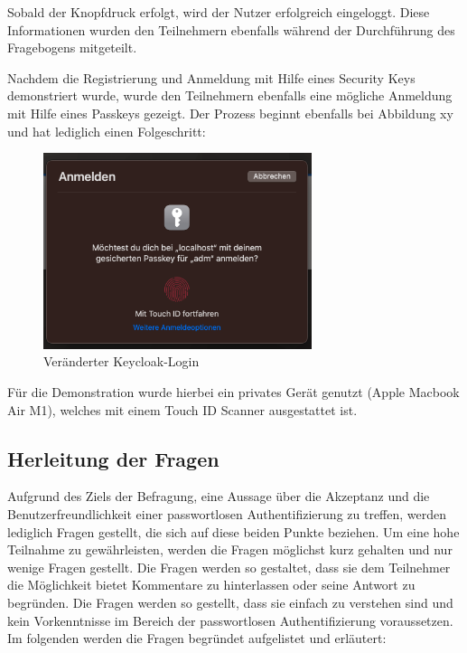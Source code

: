 Sobald der Knopfdruck erfolgt, wird der Nutzer erfolgreich eingeloggt. Diese Informationen wurden den Teilnehmern ebenfalls während der Durchführung des Fragebogens mitgeteilt. 

Nachdem die Registrierung und Anmeldung mit Hilfe eines Security Keys demonstriert wurde, wurde den Teilnehmern ebenfalls eine mögliche Anmeldung mit Hilfe eines Passkeys gezeigt. Der Prozess beginnt ebenfalls bei Abbildung xy und hat lediglich einen Folgeschritt:

\begin{figure}[h]
	\centering 
	\includegraphics[width=0.7\textwidth]{img/abbildungen/passkey_demo.png}
	\captionsetup{format=hang}
	\caption{Veränderter Keycloak-Login}
\end{figure}

Für die Demonstration wurde hierbei ein privates Gerät genutzt (Apple Macbook Air M1), welches mit einem Touch ID Scanner ausgestattet ist.


\subsection{Herleitung der Fragen} \label{questions}
Aufgrund des Ziels der Befragung, eine Aussage über die Akzeptanz und die Benutzerfreundlichkeit einer passwortlosen Authentifizierung zu treffen, werden lediglich Fragen gestellt, die sich auf diese beiden Punkte beziehen. Um eine hohe Teilnahme zu gewährleisten, werden die Fragen möglichst kurz gehalten und nur wenige Fragen gestellt. Die Fragen werden so gestaltet, dass sie dem Teilnehmer die Möglichkeit bietet Kommentare zu hinterlassen oder seine Antwort zu begründen. Die Fragen werden so gestellt, dass sie einfach zu verstehen sind und kein Vorkenntnisse im Bereich der passwortlosen Authentifizierung voraussetzen. Im folgenden werden die Fragen begründet aufgelistet und erläutert:

